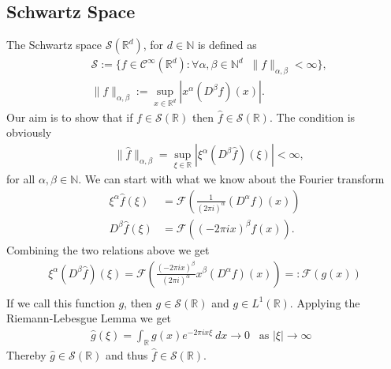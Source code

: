\documentclass[a4paper]{article}
\begin{document}
\subsection{Schwartz Space}
The Schwartz space $\mathcal{S}(\mathbb{R}^d)$, for $d \in \mathbb{N}$ is
defined as
\begin{align}
    &\mathcal{S} :=
\bigg\{
    f\in\mathcal{C}^\infty(\mathbb{R}^d):
    \forall\alpha,\beta\in\mathbb{N}^d\;\; \lVert f \rVert_{\alpha,\beta}
    < \infty
\bigg\},\\
&\lVert f \rVert_{\alpha, \beta} :=
\sup_{x\in\mathbb{R}^d}\left|x^\alpha (D^\beta f) (x) \right|.
\end{align}
Our aim is to show that if $f\in\mathcal{S}(\mathbb{R})$ then $\hat{f} \in
\mathcal{S}(\mathbb{R})$. The condition is obviously
\begin{align}
    &\lVert \hat{f} \rVert_{\alpha, \beta} =
    \sup_{\xi\in\mathbb{R}}\left|\xi^\alpha (D^\beta \hat{f}) (\xi)
    \right|<\infty,
\end{align}
for all $\alpha, \beta \in \mathbb{N}$.
We can start with what we know about the Fourier transform
\begin{align}
    \xi^\alpha \hat{f}(\xi) &= \mathcal{F}\left(\frac{1}{(2\pi
    i)^\alpha}(D^{\alpha}f)(x)\right)\\
            D^{\beta}\hat{f}(\xi) &= \mathcal{F}\left(
        (-2\pi i x)^\beta f(x)
    \right).
\end{align}
Combining the two relations above we get
\begin{align}
    \xi^\alpha (D^\beta \hat{f})(\xi) =
    \mathcal{F}\left(\frac{(-2\pi i x)^\beta}{(2\pi
    i)^\alpha}x^\beta(D^{\alpha}f)(x)\right)=: \mathcal{F}(g(x))\\
\end{align}
If we call this function $g$, then $g\in\mathcal{S}(\mathbb{R})$ and
$g\in L^1(\mathbb{R})$. Applying the Riemann-Lebesgue Lemma we get
\begin{align}
    \hat{g}(\xi) = \int_\mathbb{R} g(x) e^{-2\pi i x \xi}\ dx \longrightarrow 0
    \;\;\;  \text{as $|\xi| \rightarrow \infty$ }
\end{align}
Thereby $\hat{g} \in \mathcal{S}(\mathbb{R})$ and thus $\hat{f} \in
\mathcal{S}(\mathbb{R})$.
\end{document}
